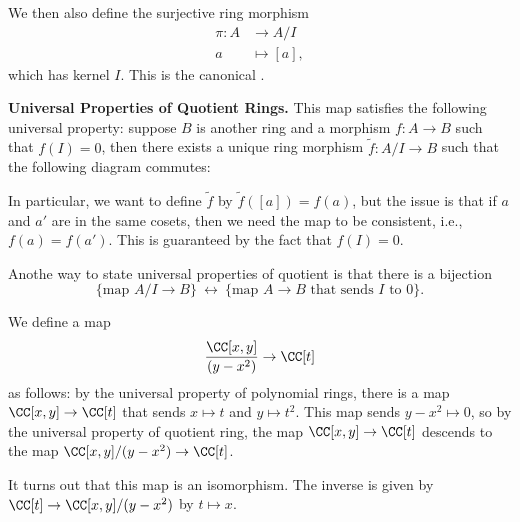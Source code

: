 We then also define the surjective ring morphism
\begin{align*}
\pi : A &\to A/I \\
a &\mapsto [a],
\end{align*}
which has kernel $I$. This is the canonical .

\textbf{Universal Properties of Quotient Rings.}
This map satisfies the following universal property:
suppose $B$ is another ring and a morphism
$f : A \to B$ such that $f(I) = 0$, then
there exists a unique ring morphism
$\widetilde f : A/I\to B$ such that
the following diagram commutes:
\begin{center}
\end{center}
In particular, we want to define $\widetilde f$ by 
$\widetilde f([a]) = f(a)$, but the issue is that if 
$a$ and $a'$ are in the same cosets, then we need the map 
to be consistent, i.e., $f(a)=f(a')$.
This is guaranteed by the fact that $f(I)=0$.

Anothe way to state universal properties of quotient is that 
there is a bijection 
$$\{\text{map } A/I\to B\} \ \longleftrightarrow\ 
\{\text{map }A\to B\text{ that sends }I\text{ to }0\}.$$
\begin{example}
We define a map 
$$\frac{\CC[x,y]}{(y-x^2)} \to \CC[t]$$
as follows: by the universal property of polynomial rings,
there is a map $\CC[x,y]\to \CC[t]$ that sends 
$x\mapsto t$ and $y\mapsto t^2$. This map sends 
$y-x^2\mapsto 0$, so by the universal property of quotient ring,
the map $\CC[x,y]\to\CC[t]$ descends to the map 
$\CC[x,y]/(y-x^2) \to \CC[t]$.

It turns out that this map is an isomorphism.
The inverse is given by $\CC[t] \to \CC[x,y]/(y-x^2)$
by $t\mapsto x$. 
\end{example}


